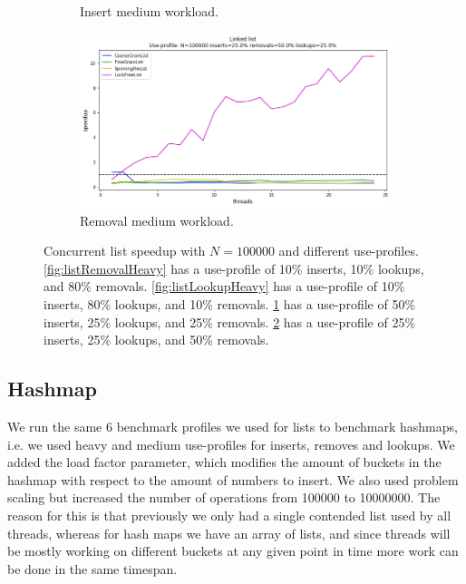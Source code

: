 \documentclass[11pt]{article}
\begin{document}
\begin{figure}[h]
\begin{subfigure}{.5\textwidth}
  \caption{Insert medium workload.}
  \label{fig:listInsertMedium}
\end{subfigure}%
\hspace*{\fill}
\begin{subfigure}{.5\textwidth}
  \centering
  \includegraphics[width=1\linewidth]{figs/lateday/combined/lateday_combined_list_insert_25_lookup_25_removal_50}
  \caption{Removal medium workload.}
  \label{fig:listRemovalMedium}
\end{subfigure}
\caption{
Concurrent list speedup with $N=100000$ and different use-profiles.
\ref{fig:listRemovalHeavy} has a use-profile of 10\% inserts, 10\% lookups, and
80\% removals. \ref{fig:listLookupHeavy} has a use-profile of 10\% inserts, 80\%
lookups, and 10\% removals. \ref{fig:listInsertMedium} has a use-profile of 50\%
inserts, 25\% lookups, and 25\% removals. \ref{fig:listRemovalMedium} has a
use-profile of 25\% inserts, 25\% lookups, and 50\% removals.
}
\label{fig:manyLists}
\end{figure}

\subsection{Hashmap} 
We run the same 6 benchmark profiles we used for
lists to benchmark hashmaps, i.e. we used heavy and medium use-profiles for inserts,
removes and lookups. We added the load factor parameter, which modifies the
amount of buckets in the hashmap with respect to the amount of
numbers to insert. We also used problem scaling but increased the number of
operations from 100000 to 10000000. The reason for this is that previously we
only had a single contended list used by all threads, whereas for hash maps we
have an array of lists, and since threads will be mostly working on
different buckets at any given point in time more work can be done in the same
timespan.
\end{document}
